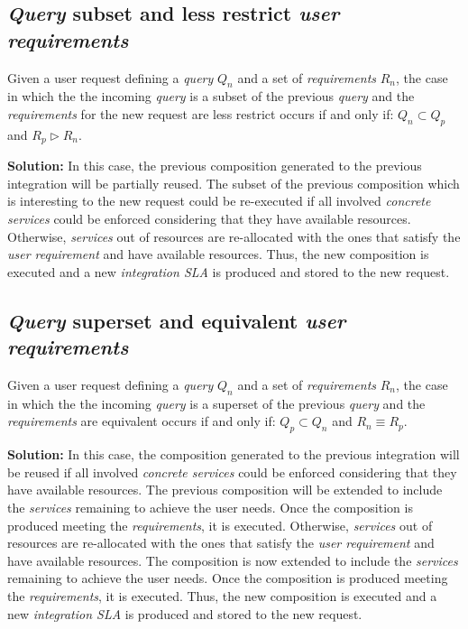 \subsection{\textsl{Query} subset and less restrict \textsl{user requirements}}
Given a user request defining a \textsl{query} $Q_{n}$ and a set of \textsl{requirements} $R_{n}$, the case in which the the incoming \textsl{query} is a subset of the previous \textsl{query} and the \textsl{requirements} for the new request are less restrict occurs if and only if: $Q_{n} \subset Q_{p}$ and $R_{p} \triangleright R_{n}$.

\bigskip
\noindent \textbf{Solution:} In this case, the previous composition generated to the previous integration will be partially reused. The subset of the previous composition which is interesting to the new request could be re-executed if all involved \textsl{concrete services} could be enforced considering that they have available resources. Otherwise, \textsl{services} out of resources are re-allocated with the ones that satisfy the \textsl{user requirement} and have available resources. Thus, the new composition is executed and a new \textsl{integration SLA} is produced and stored to the new request.

\subsection{\textsl{Query} superset and equivalent \textsl{user requirements}}
Given a user request defining a \textsl{query} $Q_{n}$ and a set of \textsl{requirements} $R_{n}$, the case in which the the incoming \textsl{query} is a superset of the previous \textsl{query} and the \textsl{requirements} are equivalent occurs if and only if: $Q_{p} \subset Q_{n}$ and $R_{n} \equiv R_{p}$.

\bigskip
\noindent \textbf{Solution:} In this case, the composition generated to the previous integration will be reused if all involved \textsl{concrete services} could be enforced considering that they have available resources. The previous composition will be extended to include the \textsl{services} remaining to achieve the user needs. Once the composition is produced meeting the \textsl{requirements}, it is executed. Otherwise, \textsl{services} out of resources are re-allocated with the ones that satisfy the \textsl{user requirement} and have available resources. The composition is now extended to include the \textsl{services} remaining to achieve the user needs. Once the composition is produced meeting the \textsl{requirements}, it is executed. Thus, the new composition is executed and a new \textsl{integration SLA} is produced and stored to the new request.

